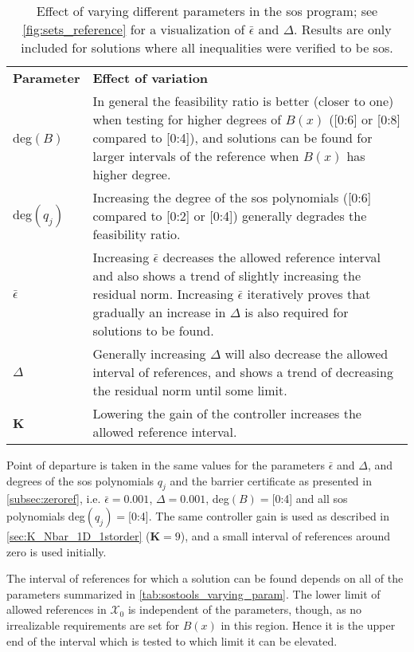 \begin{table}[htbp]
\begin{tabularx}{\textwidth}{l X}
\rowcolor{HeaderBlue}
\textbf{Parameter} & \textbf{Effect of variation}\\
deg$(B)$ & In general the feasibility ratio is better (closer to one) when testing for higher degrees of $B(x)$ ([0:6] or [0:8] compared to [0:4]), and solutions can be found for larger intervals of the reference when $B(x)$ has higher degree.\\
\rowcolor{textBlue}
deg$(q_j)$ & Increasing the degree of the \gls{sos} polynomials ([0:6] compared to [0:2] or [0:4]) generally degrades the feasibility ratio.\\
$\bar{\epsilon}$ & Increasing $\bar{\epsilon}$ decreases the allowed reference interval and also shows a trend of slightly increasing the residual norm. Increasing $\bar{\epsilon}$ iteratively proves that gradually an increase in $\Delta$ is also required for solutions to be found. \\
\rowcolor{textBlue}
$\Delta$ & Generally increasing $\Delta$ will also decrease the allowed interval of references, and shows a trend of decreasing the residual norm until some limit.\\
\textbf{K} & Lowering the gain of the controller increases  the allowed reference interval.
\end{tabularx}
\caption{Effect of varying different parameters in the \gls{sos} program; see \autoref{fig:sets_reference} for a visualization of $\bar{\epsilon}$ and $\Delta$. Results are only included for solutions where all inequalities were verified to be \gls{sos}.}
\label{tab:sostools_varying_param}
\end{table}


Point of departure is taken in the same values for the parameters $\bar{\epsilon}$ and $\Delta$, and degrees of the \gls{sos} polynomials $q_j$ and the barrier certificate as presented in \autoref{subsec:zeroref}, i.e. $\bar{\epsilon}=0.001$, $\Delta=0.001$, deg$(B)=$[0:4] and all \gls{sos} polynomials deg$(q_j)=$[0:4]. The same controller gain is used as described in \autoref{sec:K_Nbar_1D_1storder} ($\textbf{K}=9$), and a small interval of references around zero is used initially.

The interval of references for which a solution can be found depends on all of the parameters summarized in \autoref{tab:sostools_varying_param}. The lower limit of allowed references in $\mathcal{X}_0$ is independent of the parameters, though,  as no irrealizable requirements are set for $B(x)$ in this region. Hence it is the upper  end of the interval which is tested to which limit it can be elevated.




